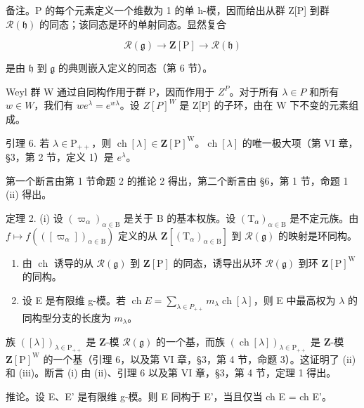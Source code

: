 备注。P 的每个元素定义一个维数为 1 的单 h-模，因而给出从群 Z{[}P{]} 到群 \(\mathcal{R}(\mathfrak{h})\) 的同态；该同态是环的单射同态。显然复合

\[
\mathcal {R} (\mathfrak {g}) \longrightarrow \mathbf {Z} [ \mathrm{P} ] \longrightarrow \mathcal {R} (\mathfrak {h})
\]

是由 \(\mathfrak{h}\) 到 \(\mathfrak{g}\) 的典则嵌入定义的同态（第 6 节）。

Weyl 群 W 通过自同构作用于群 P，因而作用于 \(Z^{P}\)。对于所有 \(\lambda \in P\) 和所有 \(w \in W\)，我们有 \(we^{\lambda} = e^{w\lambda}\)。设 \(Z[P]^{W}\) 是 Z{[}P{]} 的子环，由在 W 下不变的元素组成。

引理 6. 若 \(\lambda \in \mathrm{P}_{++}\)，则 \(\operatorname{ch}[\lambda] \in \mathbf{Z}[\mathrm{P}]^{\mathrm{W}}\)。\(\operatorname{ch}[\lambda]\) 的唯一极大项（第 VI 章，§3，第 2 节，定义 1）是 \(e^{\lambda}\)。

第一个断言由第 1 节命题 2 的推论 2 得出，第二个断言由 §6，第 1 节，命题 1 (ii) 得出。

定理 2. (i) 设 \((\varpi_{\alpha})_{\alpha \in \mathrm{B}}\) 是关于 B 的基本权族。设 \((\mathrm{T}_{\alpha})_{\alpha \in \mathrm{B}}\) 是不定元族。由 \(f\mapsto f(\left([ \varpi_{\alpha} ]\right)_{\alpha \in \mathrm{B}})\) 定义的从 \(\mathbf{Z}[(\mathrm{T}_{\alpha})_{\alpha \in \mathrm{B}}]\) 到 \(\mathcal{R}(\mathfrak{g})\) 的映射是环同构。

\begin{enumerate}
\def\labelenumi{(\roman{enumi})}
\setcounter{enumi}{1}
\item
  由 \(\operatorname{ch}\) 诱导的从 \(\mathcal{R}(\mathfrak{g})\) 到 \(\mathbf{Z}[\mathrm{P}]\) 的同态，诱导出从环 \(\mathcal{R}(\mathfrak{g})\) 到环 \(\mathbf{Z}[\mathrm{P}]^{\mathrm{W}}\) 的同构。
\item
  设 E 是有限维 g-模。若 \(\operatorname{ch} E = \sum_{\lambda \in P_{++}} m_{\lambda} \operatorname{ch}[\lambda]\)，则 E 中最高权为 \(\lambda\) 的同构型分支的长度为 \(m_{\lambda}\)。
\end{enumerate}

族 \(([\lambda])_{\lambda \in \mathrm{P}_{++}}\) 是 \(\mathbf{Z}\)-模 \(\mathcal{R}(\mathfrak{g})\) 的一个基，而族 \((\operatorname{ch}[\lambda])_{\lambda \in \mathrm{P}_{++}}\) 是 \(\mathbf{Z}\)-模 \(\mathbf{Z}[\mathrm{P}]^{\mathrm{W}}\) 的一个基（引理 6，以及第 VI 章，§3，第 4 节，命题 3）。这证明了 (ii) 和 (iii)。断言 (i) 由 (ii)、引理 6 以及第 VI 章，§3，第 4 节，定理 1 得出。

推论。设 E、E' 是有限维 g-模。则 E 同构于 E'，当且仅当 ch E = ch E'。

